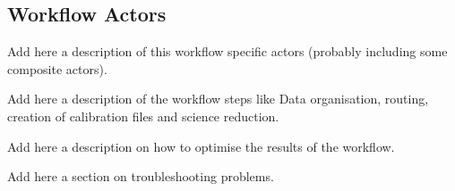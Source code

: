 \documentclass[pdftex,a4paper,twoside,11pt]{article}
\begin{document}
\subsection{Workflow Actors}

Add here a description of this workflow specific actors 
(probably including some composite actors).


Add here a description of the workflow steps like Data organisation,
routing, creation of calibration files and science reduction.

Add here a description on how to optimise the results of the workflow.



Add here a section on troubleshooting problems.


\end{document}
